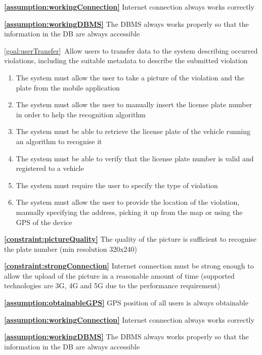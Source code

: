 \begin{description}
			\textbf{\ref{assumption:workingConnection}} Internet connection always works correctly
			
			\textbf{\ref{assumption:workingDBMS}} The DBMS always works properly so that the information in the DB are always accessible \newline
			
		\item \ref{goal:userTransfer}\ Allow users to transfer data to the system describing occurred violations, including the suitable metadata to describe the submitted violation			
			 \begin{enumerate}[resume*]
				\item The system must allow the user to take a picture of the violation and the plate from the mobile application
  				\item The system must allow the user to manually insert the license plate number in order to help the recognition algorithm
  				\item The system must be able to retrieve the license plate of the vehicle running an algorithm to recognise it
  				\item The system must be able to verify that the license plate number is valid and registered to a vehicle
  				\item The system must require the user to specify the type of violation
  				\item The system must allow the user to provide the location of the violation, manually specifying the address, picking it up from the map or using the GPS of the device
   			\end{enumerate}
   			
   			\textbf{\ref{constraint:pictureQuality}} The quality of the picture is sufficient to recognise the plate number (min resolution 320x240)
   			
			\textbf{\ref{constraint:strongConnection}} Internet connection must be strong enough to allow the upload of the picture in a reasonable amount of time (supported technologies are 3G, 4G and 5G due to the performance requirement)
			
			\textbf{\ref{assumption:obtainableGPS}} GPS position of all users is always obtainable
			
			\textbf{\ref{assumption:workingConnection}} Internet connection always works correctly
			
			\textbf{\ref{assumption:workingDBMS}} The DBMS always works properly so that the information in the DB are always accessible \newline
			

\end{description}
